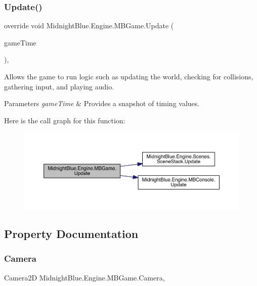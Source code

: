 \subsubsection{\texorpdfstring{Update()}{Update()}}
{\footnotesize\ttfamily override void Midnight\+Blue.\+Engine.\+M\+B\+Game.\+Update (\begin{DoxyParamCaption}\item[{Game\+Time}]{game\+Time }\end{DoxyParamCaption})\hspace{0.3cm}{\ttfamily [inline]}, {\ttfamily [protected]}}



Allows the game to run logic such as updating the world, checking for collisions, gathering input, and playing audio. 


\begin{DoxyParams}{Parameters}
{\em game\+Time} & Provides a snapshot of timing values.\\
\hline
\end{DoxyParams}
Here is the call graph for this function\+:
\nopagebreak
\begin{figure}[H]
\begin{center}
\leavevmode
\includegraphics[width=350pt]{class_midnight_blue_1_1_engine_1_1_m_b_game_a10a451d83e4163e9bb1c9bcdc6719db3_cgraph}
\end{center}
\end{figure}


\subsection{Property Documentation}
\hypertarget{class_midnight_blue_1_1_engine_1_1_m_b_game_a5fffc745c017e76c148816493f7d0cbb}{}\label{class_midnight_blue_1_1_engine_1_1_m_b_game_a5fffc745c017e76c148816493f7d0cbb} 
\subsubsection{\texorpdfstring{Camera}{Camera}}
{\footnotesize\ttfamily Camera2D Midnight\+Blue.\+Engine.\+M\+B\+Game.\+Camera\hspace{0.3cm}{\ttfamily [static]}, {\ttfamily [get]}}



